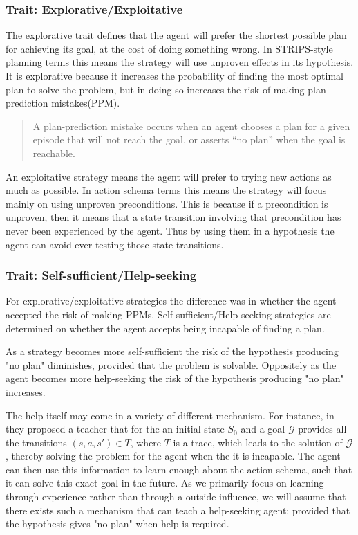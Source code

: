 \documentclass[../Master.tex]{subfiles}
\begin{document}
\subsubsection{Trait: Explorative/Exploitative}

	The explorative trait defines that the agent will prefer the shortest possible plan for achieving its goal,
	at the cost of doing something wrong.
	In STRIPS-style planning terms this means the strategy will use unproven effects in its hypothesis.
	It is explorative because it increases the probability of finding the most optimal plan to solve the problem,
	but in doing so increases the risk of making plan-prediction mistakes(PPM).
	\begin{quotation}
				A plan-prediction mistake occurs when an
				agent chooses a plan for a given episode that will not reach
				the goal, or asserts “no plan” when the goal is reachable. \cite{Walsh2008}
	\end{quotation}

	An exploitative strategy means the agent will prefer to trying new actions as much as possible.
	In action schema terms this means the strategy will focus mainly on using unproven preconditions.
	This is because if a precondition is unproven, then it means that a state transition involving that precondition has never been experienced by the agent.
	Thus by using them in a hypothesis the agent can avoid ever testing those state transitions.




\subsubsection{Trait: Self-sufficient/Help-seeking}

	For explorative/exploitative strategies the difference was in whether the agent accepted the risk of making PPMs.
	Self-sufficient/Help-seeking strategies are determined on whether the agent accepts being incapable of finding a plan.

	As a strategy becomes more self-sufficient the risk of the hypothesis producing "no plan" diminishes, provided that the problem is solvable.
	Oppositely as the agent becomes more help-seeking the risk of the hypothesis producing "no plan" increases.

	The help itself may come in a variety  of different mechanism.
	For instance, in \cite{Walsh2008} they proposed a teacher that for the an initial state $S_0$ and a goal $\mathcal{G}$ provides all the transitions $(s,a,s') \in T$, where $T$ is a trace, which leads to the solution of $\mathcal{G}$,
	 thereby solving the problem for the agent when the it is incapable.
	The agent can then use this information to learn enough about the action schema, such that it can solve this exact goal in the future.
	As we primarily focus on learning through experience rather than through a outside influence, we will assume that there exists such a mechanism that can teach a help-seeking agent;
	provided that the hypothesis gives "no plan" when help is required.
\end{document}
